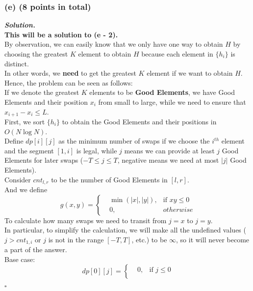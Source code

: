 \documentclass[12pt, a4paper, UTF8]{article}
\newenvironment{solution}[1][\it{Solution}]{\textbf{#1. }\\}{\begin{flushright}$\square$\end{flushright}}
\begin{document}
        \subsubsection*{(e) (8 points in total)}
            \begin{solution}
                \textbf{This will be a solution to (e - 2).}\\
                By observation, we can easily know that we only have one way to obtain $H$ by choosing the greatest $K$ element to obtain $H$ because each element in $\{h_i\}$ is distinct.\\
                In other words, we \textbf{need} to get the greatest $K$ element if we want to obtain $H$.\\
                Hence, the problem can be seen as follows:\\
                If we denote the greatest $K$ elements to be \textbf{Good Elements}, we have Good Elements and their position $x_i$ from small to large, while we need to ensure that $x_{i + 1} - x_i \le L$.\\
                First, we sort $\{h_i\}$ to obtain the Good Elements and their positions in $O(N\log{N})$.\\
                Define $dp[i][j]$ as the minimum number of swaps if we choose the $i^{th}$ element and the segment $[1, i]$ is legal, while $j$ means we can provide at least $j$ Good Elements for later swaps ($-T \le j \le T$, negative means we need at most $|j|$ Good Elements).\\
                Consider $cnt_{l, r}$ to be the number of Good Elements in $[l, r]$.\\
                And we define $$g(x, y) = \left\{\begin{split}
                    & \min(|x|, |y|),& \text{if } xy \le 0\\
                    & 0,& otherwise
                \end{split}\right.$$
                To calculate how many swaps we need to transit from $j = x$ to $j = y$.\\
                In particular, to simplify the calculation, we will make all the undefined values ($j > cnt_{1, i}$ or $j$ is not in the range $[-T, T]$, etc.) to be $\infty$, so it will never become a part of the answer.\\
                Base case: $$dp[0][j] = \left\{\begin{split}
                    &0,& \text{if } j \le 0\\

\end{split}$$
\end{solution}
\end{document}

